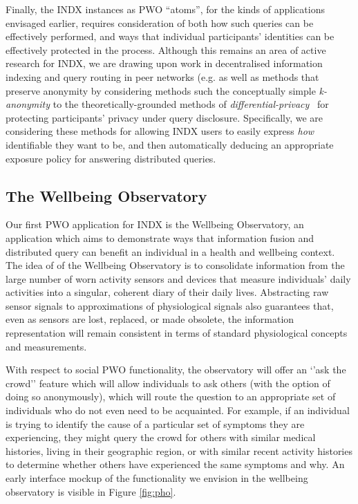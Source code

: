 \documentclass[letterpaper]{sig-alternate}
\begin{document}
Finally, the INDX instances as PWO ``atoms'', for the kinds of applications envisaged earlier, requires consideration of both how such queries can be effectively performed, and ways that individual participants' identities can be effectively protected in the process.  Although this remains an area of active research for INDX, we are drawing upon work in decentralised information indexing and query routing in peer networks (e.g. \cite{cudre2007gridvine,tatarinov2003piazza} as well as methods that preserve anonymity by considering methods such the conceptually simple \emph{k-anonymity} \cite{sweeney2002k} to the theoretically-grounded methods of \emph{differential-privacy}~\cite{dwork2006differential} for protecting participants' privacy under query disclosure. Specifically, we are considering these methods for allowing INDX users to easily express \emph{how} identifiable they want to be, and then automatically deducing an appropriate exposure policy for answering distributed queries.  



\subsection{The Wellbeing Observatory}

Our first PWO application for INDX is the Wellbeing Observatory, an application which aims to demonstrate ways that information fusion and distributed query can benefit an individual in a health and wellbeing context. The idea of of the Wellbeing Observatory is to consolidate information from the large number of worn activity sensors and devices that measure individuals' daily activities into a singular, coherent diary of their daily lives.  Abstracting raw sensor signals to approximations of physiological signals also guarantees that, even as sensors are lost, replaced, or made obsolete, the information representation will remain consistent in terms of standard physiological concepts and measurements.

With respect to social PWO functionality, the observatory will offer an `'ask the crowd'' feature which will allow individuals to ask others (with the option of doing so anonymously), which will route the question to an appropriate set of individuals who do not even need to be acquainted.  For example, if an individual is trying to identify the cause of a particular set of symptoms they are experiencing, they might query the crowd for others with similar medical histories, living in their geographic region, or with similar recent activity histories to determine whether others have experienced the same symptoms and why.  An early interface mockup of the functionality we envision in the wellbeing observatory is visible in Figure \ref{fig:pho}.
\end{document}
